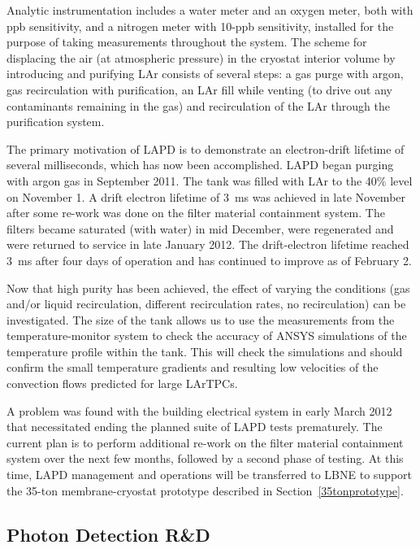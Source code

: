 Analytic instrumentation includes a water meter and an oxygen meter, both with ppb sensitivity, and a nitrogen meter with 10-ppb sensitivity, installed for the purpose of taking measurements throughout the system. The scheme for 
displacing the air (at atmospheric pressure) in  the cryostat interior volume by introducing and purifying LAr consists of several steps: a gas purge with argon,  gas recirculation with purification, an LAr fill while venting (to drive out any contaminants remaining in the gas) and recirculation of the LAr through the purification system. 

The primary motivation of LAPD is to demonstrate an electron-drift lifetime of several milliseconds, which has now been accomplished. LAPD began purging with argon gas in September 2011. The tank was filled with LAr to the 40\% level on November 1. A drift electron lifetime of 3~ms was achieved in late November after some re-work was done on the filter material containment system. The filters became saturated (with water) in mid December, were regenerated and were returned to service in late January 2012. The drift-electron lifetime reached 3~ms after four days of operation and has continued to improve as of February 2.

Now that high purity has been achieved, the effect of varying the conditions (gas and/or liquid recirculation, different recirculation rates, no recirculation) can be investigated. The size of the tank allows us to use the measurements from the temperature-monitor system to check the accuracy of ANSYS simulations of the temperature profile within the tank. This will check the simulations and should confirm the small temperature gradients and resulting low velocities of the convection flows predicted for large LArTPCs.

A problem was found with the building electrical system in early March 2012 that necessitated ending the planned suite of LAPD tests prematurely. The current plan is to perform additional re-work on the filter material containment system over the next few months, followed by a second phase of testing. At this time, LAPD management and operations will be transferred to LBNE to support the 35-ton membrane-cryostat prototype described in Section~\ref{35tonprototype}.

\subsection{Photon Detection R\&D}

